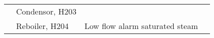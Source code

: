 \begin{table}[]
{\begin{tabular}{@{}llll@{}}
\multicolumn{1}{l|}{}                    & \multicolumn{1}{l|}{\multirow{3}{*}{Condensor,   H203}}         & \multicolumn{1}{l|}{}                                                                                                                                                                                                         & \multicolumn{1}{l|}{}                                                                                                                                                                                                       \\ \cmidrule(l){3-4} 
\multicolumn{1}{l|}{}                    & \multicolumn{1}{l|}{}                                           & \multicolumn{1}{l|}{}                                                                                                                                                                                                         & \multicolumn{1}{l|}{}                                                                                                                                                                                                       \\ \cmidrule(l){3-4} 
\multicolumn{1}{l|}{}                    & \multicolumn{1}{l|}{}                                           & \multicolumn{1}{l|}{}                                                                                                                                                                                                         & \multicolumn{1}{l|}{}                                                                                                                                                                                                       \\ \cmidrule(l){2-4} 
\multicolumn{1}{l|}{}                    & \multicolumn{1}{l|}{Reboiler, H204}                             & \multicolumn{1}{l|}{Low flow alarm   saturated steam}                                                                                                                                                                         & \multicolumn{1}{l|}{}                                                                                                                                                                                                       \\ \cmidrule(l){2-4} 
\end{tabular}%
}
\end{table}